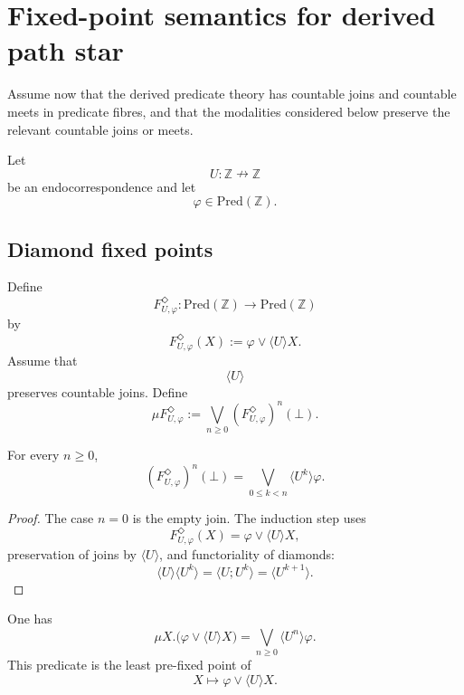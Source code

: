 \section{Fixed-point semantics for derived path star}
\label{sec:derived-fixed-point-semantics}

Assume now that the derived predicate theory has countable joins and countable
meets in predicate fibres, and that the modalities considered below preserve
the relevant countable joins or meets.

Let
\[
U:\mathbb Z\nrightarrow\mathbb Z
\]
be an endocorrespondence and let
\[
\varphi\in\mathrm{Pred}(\mathbb Z).
\]

\subsection{Diamond fixed points}
\label{subsec:derived-diamond-fixed-points}

Define
\[
F^\Diamond_{U,\varphi}:\mathrm{Pred}(\mathbb Z)\to
\mathrm{Pred}(\mathbb Z)
\]
by
\[
F^\Diamond_{U,\varphi}(X)
:=
\varphi\vee\langle U\rangle X.
\]
Assume that
\[
\langle U\rangle
\]
preserves countable joins. Define
\[
\mu F^\Diamond_{U,\varphi}
:=
\bigvee_{n\ge0}(F^\Diamond_{U,\varphi})^n(\bot).
\]

\begin{lemma}
\label{lem:derived-diamond-approximants}
For every \(n\ge0\),
\[
(F^\Diamond_{U,\varphi})^n(\bot)
=
\bigvee_{0\le k<n}\langle U^k\rangle\varphi.
\]
\end{lemma}

\begin{proof}
The case \(n=0\) is the empty join. The induction step uses
\[
F^\Diamond_{U,\varphi}(X)=\varphi\vee\langle U\rangle X,
\]
preservation of joins by \(\langle U\rangle\), and functoriality of diamonds:
\[
\langle U\rangle\langle U^k\rangle
=
\langle U;U^k\rangle
=
\langle U^{k+1}\rangle.
\]
\end{proof}

\begin{theorem}
\label{thm:derived-diamond-lfp}
One has
\[
\mu X.\bigl(\varphi\vee\langle U\rangle X\bigr)
=
\bigvee_{n\ge0}\langle U^n\rangle\varphi.
\]
This predicate is the least pre-fixed point of
\[
X\longmapsto \varphi\vee\langle U\rangle X.
\]
\end{theorem}

